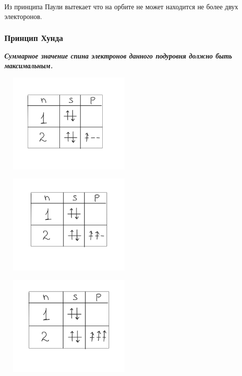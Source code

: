 \documentclass[../main.tex]{subfiles}
\begin{document}
Из принципа Паули вытекает что на орбите не может находится не более двух электоронов.

\subsubsection{Принцип Хунда}
\begin{center}
    \textbf{\textit{Суммарное значение спина электронов данного подуровня должно быть максимальным.}}
\end{center}
\begin{center}
    \includegraphics[height=5cm, width=7cm]{../img/kvantovy17.png}
\end{center}
\begin{center}
    \includegraphics[height=5cm, width=7cm]{../img/kvantovy18.png}
\end{center}
\begin{center}
    \includegraphics[height=5cm, width=7cm]{../img/kvantovy19.png}
\end{center}
\end{document}
